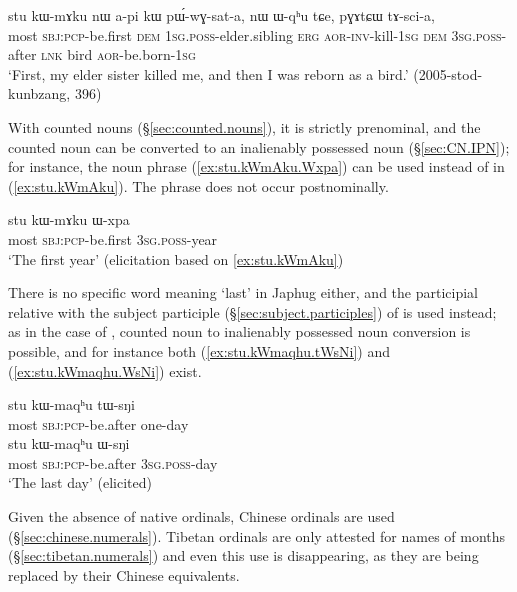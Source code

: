 \begin{exe}
\ex  \label{ex:stu.kWmAku2}
\gll stu kɯ-mɤku nɯ a-pi kɯ pɯ́-wɣ-sat-a,  nɯ ɯ-qʰu tɕe, pɣɤtɕɯ tɤ-sci-a, \\
most \textsc{sbj}:\textsc{pcp}-be.first \textsc{dem} \textsc{1sg}.\textsc{poss}-elder.sibling \textsc{erg} \textsc{aor}-\textsc{inv}-kill-\textsc{1sg} \textsc{dem} \textsc{3sg}.\textsc{poss}-after \textsc{lnk} bird \textsc{aor}-be.born-\textsc{1sg} \\
\glt `First, my elder sister killed me, and then I was reborn as a bird.' (2005-stod-kunbzang, 396)
\end{exe}

With counted nouns (§\ref{sec:counted.nouns}), it is strictly prenominal, and the counted noun can be converted to an inalienably possessed noun (§\ref{sec:CN.IPN}); for instance, the noun phrase (\ref{ex:stu.kWmAku.Wxpa}) can be used instead of  in (\ref{ex:stu.kWmAku}). The phrase  does not occur postnominally.

\begin{exe}
\ex  \label{ex:stu.kWmAku.Wxpa}
\gll  stu kɯ-mɤku ɯ-xpa \\
 most \textsc{sbj}:\textsc{pcp}-be.first \textsc{3sg}.\textsc{poss}-year  \\
\glt  `The first year' (elicitation based on \ref{ex:stu.kWmAku})
\end{exe}

There is no specific word meaning `last' in Japhug either, and the participial relative   with the subject participle (§\ref{sec:subject.participles}) of  is used instead; as in the case of , counted noun to inalienably possessed noun conversion is possible, and for instance both (\ref{ex:stu.kWmaqhu.tWsNi}) and (\ref{ex:stu.kWmaqhu.WsNi}) exist.

\begin{exe}
\ex \label{ex:stu.kWmaqhu.tWsNi}
\gll  stu kɯ-maqʰu tɯ-sŋi  \\
 most \textsc{sbj}:\textsc{pcp}-be.after one-day \\
 \ex \label{ex:stu.kWmaqhu.WsNi}
\gll  stu kɯ-maqʰu ɯ-sŋi  \\
 most \textsc{sbj}:\textsc{pcp}-be.after \textsc{3sg}.\textsc{poss}-day \\
\glt `The last day' (elicited)
\end{exe}

Given the absence of native ordinals,  Chinese ordinals are used  (§\ref{sec:chinese.numerals}). Tibetan ordinals are only attested for names of months (§\ref{sec:tibetan.numerals}) and even this use is disappearing, as they are being replaced by their Chinese equivalents.

